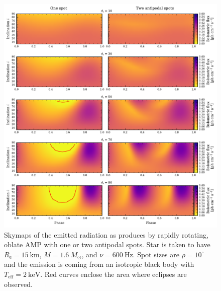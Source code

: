 \documentclass[iop, usenatbib]{emulateapj}
\newcommand{\Msun}{\ensuremath{M_{\odot}}}
\begin{document}
\begin{figure}
\includegraphics[width=18cm]{figs/fig7.pdf}
\caption{\label{fig:skymap}
    Skymaps of the emitted radiation as produces by rapidly rotating, oblate AMP with one or two antipodal spots.
    Star is taken to have $R_{\mathrm{e}} = 15~\mathrm{km}$, $M=1.6~\Msun$, and $\nu = 600~\mathrm{Hz}$.
    Spot sizes are $\rho = 10^{\circ}$ and the emission is coming from an isotropic black body with $T_{\mathrm{eff}} = 2~\mathrm{keV}$.
    Red curves enclose the area where eclipses are observed.
  }
\end{figure}
\end{document}
